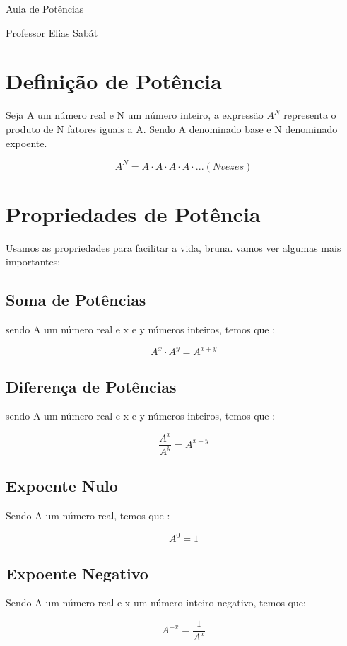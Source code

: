 \documentclass[a4paper, 12pt]{article}
\begin{document}
\begin{center}
\huge{Aula de Potências}
\end{center}

\begin{center}
Professor Elias Sabát
\end{center}
 
\section{Definição de Potência}

Seja A um número real e N um número inteiro, a expressão $A^N$ representa o produto de N fatores iguais a A. Sendo A denominado base e N denominado expoente.

$$ A^N = A \cdot A \cdot A \cdot A \cdot ... (N vezes) $$ 

\section{Propriedades de Potência}
Usamos as propriedades para facilitar a vida, bruna. vamos ver algumas mais importantes:

\subsection{Soma de Potências}
sendo A um número real e x e y números inteiros, temos que : 

$$ A^x \cdot A^y = A^{x+y}$$

\subsection{Diferença de Potências}
sendo A um número real e x e y números inteiros, temos que :

$$\dfrac{A^x}{A^y} = A^{x-y} $$

\subsection{Expoente Nulo}
Sendo A um número real, temos que :

$$ A^0 = 1 $$

\subsection{Expoente Negativo}
Sendo A um número real e x um número inteiro negativo, temos que:

$$ A^{-x}  =  \dfrac{1}{A^x}$$
\end{document}
